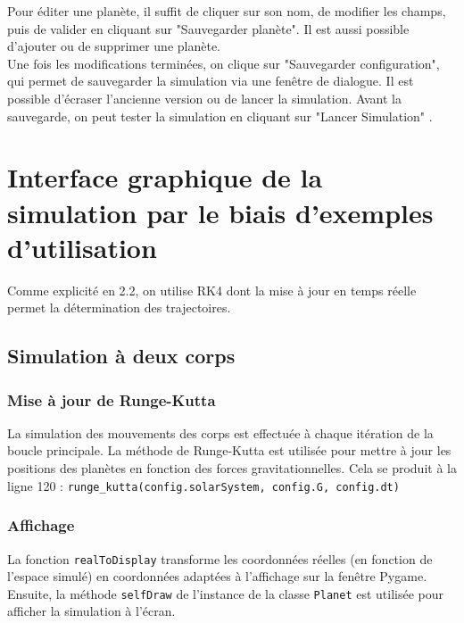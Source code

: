 \documentclass[a4paper, 12pt]{article}
\begin{document}
	Pour éditer une planète, il suffit de cliquer sur son nom, de modifier les champs, puis de valider en cliquant sur "Sauvegarder planète". Il est aussi possible d'ajouter ou de supprimer une planète.\\
	
	Une fois les modifications terminées, on clique sur "Sauvegarder configuration", qui permet de sauvegarder la simulation via une fenêtre de dialogue. Il est possible d'écraser l'ancienne version ou de lancer la simulation. Avant la sauvegarde, on peut tester la simulation en cliquant sur "Lancer Simulation"
.


\section{Interface graphique de la simulation par le biais d'exemples d'utilisation} 
Comme explicité en 2.2, on utilise RK4 dont la mise à jour en temps réelle permet la détermination des trajectoires.

\subsection{Simulation à deux corps}
\subsubsection{Mise à jour de Runge-Kutta}
La simulation des mouvements des corps est effectuée à chaque itération de la boucle principale. La méthode de Runge-Kutta est utilisée pour mettre à jour les positions des planètes en fonction des forces gravitationnelles. Cela se produit à la ligne 120 : \texttt{runge\_kutta(config.solarSystem, config.G, config.dt)}

\subsubsection{Affichage}
La fonction \texttt{realToDisplay} transforme les coordonnées réelles (en fonction de l'espace simulé) en coordonnées adaptées à l'affichage sur la fenêtre Pygame. Ensuite, la méthode \texttt{selfDraw} de l'instance de la classe \texttt{Planet} est utilisée pour afficher la simulation à l'écran.
\end{document}
